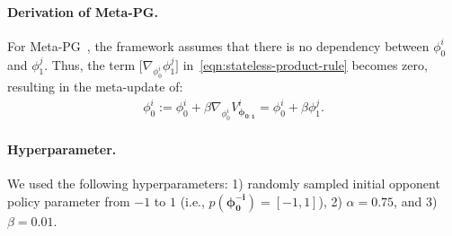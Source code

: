 \noindent\paragraph{Derivation of Meta-PG.}
For Meta-PG~\citep{alshedivat2018continuous}, the framework assumes that there is no dependency between $\phi^{i}_{0}$ and $\phi^{j}_{1}$. 
Thus, the term $\big[\nabla_{\phi^{i}_{0}}\phi^{j}_{1}\big]$ in~\cref{eqn:stateless-product-rule} becomes zero, resulting in the meta-update of:
\begin{gather}
\phi^{i}_{0}:=\phi^{i}_{0}+\beta\nabla_{\phi^{i}_{0}}V^{i}_{\bm{\phi}_{\bm{0:1}}}=\phi^{i}_{0}+\beta\phi^{j}_{1}.
\end{gather}

\noindent\paragraph{Hyperparameter.}
We used the following hyperparameters: 1) randomly sampled initial opponent policy parameter from $-1$ to $1$ (i.e., $p(\bm{\phi}^{\bm{-i}}_{\bm{0}})=[-1, 1]$), 2) $\alpha\!=\!0.75$, and 3) $\beta\!=\!0.01$.

